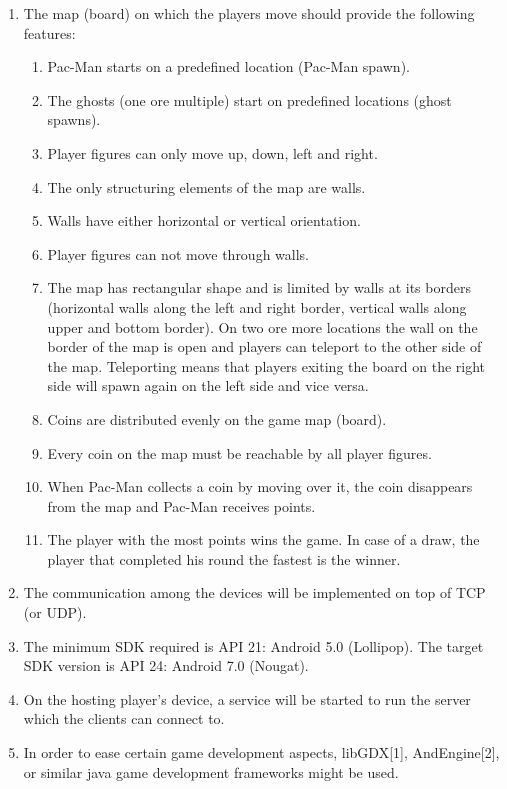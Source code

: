 \documentclass{report}
\begin{document}
\begin{enumerate}
	\item The map (board) on which the players move should provide the following features:
	\begin{enumerate}
		\item Pac-Man starts on a predefined location (Pac-Man spawn).
		\item The ghosts (one ore multiple) start on predefined locations (ghost spawns).
		\item Player figures can only move up, down, left and right.
		\item The only structuring elements of the map are walls.
		\item Walls have either horizontal or vertical orientation.
		\item Player figures can not move through walls.
		\item The map has rectangular shape and is limited by walls at its borders (horizontal walls along the left and right border, vertical walls along upper and bottom border). On two ore more locations the wall on the border of the map is open and players can teleport to the other side of the map. Teleporting means that players exiting the board on the right side will spawn again on the left side and vice versa.
		\item Coins are distributed evenly on the game map (board).
		\item Every coin on the map must be reachable by all player figures. 
		\item When Pac-Man collects a coin by moving over it, the coin disappears from the map and Pac-Man receives points.
		\item The player with the most points wins the game. In case of a draw, the player that completed his round the fastest is the winner.
	\end{enumerate}
	
	\item The communication among the devices will be implemented on top of TCP (or UDP).
	\item The minimum SDK required is API 21: Android 5.0 (Lollipop). The target SDK version is API 24: Android 7.0 (Nougat).
	\item On the hosting player's device, a service will be started to run the server which the clients can connect to.
	\item In order to ease certain game development aspects, libGDX[1], AndEngine[2], or similar java game development frameworks might be used.
	
\end{enumerate}
\end{document}

